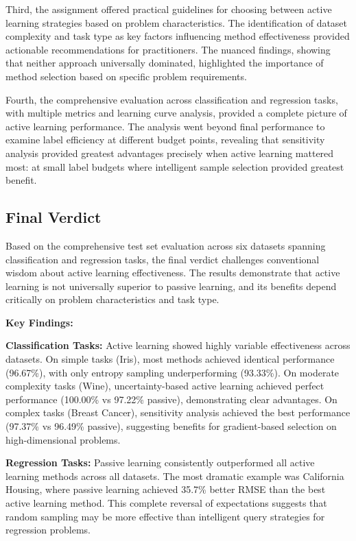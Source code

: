 \documentclass[conference]{IEEEtran}
\begin{document}
Third, the assignment offered practical guidelines for choosing between active learning strategies based on problem characteristics. The identification of dataset complexity and task type as key factors influencing method effectiveness provided actionable recommendations for practitioners. The nuanced findings, showing that neither approach universally dominated, highlighted the importance of method selection based on specific problem requirements.

Fourth, the comprehensive evaluation across classification and regression tasks, with multiple metrics and learning curve analysis, provided a complete picture of active learning performance. The analysis went beyond final performance to examine label efficiency at different budget points, revealing that sensitivity analysis provided greatest advantages precisely when active learning mattered most: at small label budgets where intelligent sample selection provided greatest benefit.

\subsection{Final Verdict}

Based on the comprehensive test set evaluation across six datasets spanning classification and regression tasks, the final verdict challenges conventional wisdom about active learning effectiveness. The results demonstrate that active learning is not universally superior to passive learning, and its benefits depend critically on problem characteristics and task type.

\textbf{Key Findings:}

\textbf{Classification Tasks:} Active learning showed highly variable effectiveness across datasets. On simple tasks (Iris), most methods achieved identical performance (96.67\%), with only entropy sampling underperforming (93.33\%). On moderate complexity tasks (Wine), uncertainty-based active learning achieved perfect performance (100.00\% vs 97.22\% passive), demonstrating clear advantages. On complex tasks (Breast Cancer), sensitivity analysis achieved the best performance (97.37\% vs 96.49\% passive), suggesting benefits for gradient-based selection on high-dimensional problems.

\textbf{Regression Tasks:} Passive learning consistently outperformed all active learning methods across all datasets. The most dramatic example was California Housing, where passive learning achieved 35.7\% better RMSE than the best active learning method. This complete reversal of expectations suggests that random sampling may be more effective than intelligent query strategies for regression problems.
\end{document}
